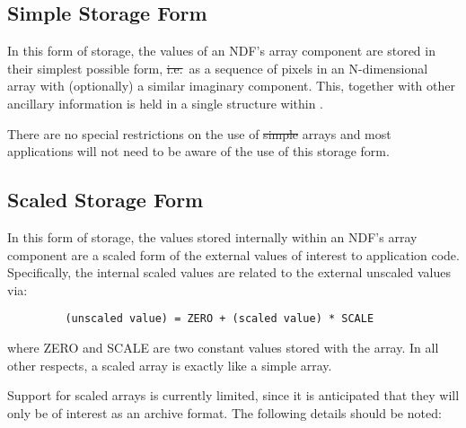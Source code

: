 \subsection{\label{ss:simpleform}Simple Storage Form}

In this form of storage, the values of an NDF's array component 
are stored in their simplest possible form, \st{i.e.}\ as a sequence of
pixels in an N-dimensional array with (optionally) a similar imaginary
component. 
This, together with other ancillary information is held in a single
 structure within .

There are no special restrictions on the use of \st{simple\/} arrays and most
applications will not need to be aware of the use of this storage form. 

\subsection{\label{ss:scaledform}Scaled Storage Form}

In this form of storage, the values stored internally within an NDF's array 
component are a scaled form of the external values of interest to
application code. Specifically, the internal scaled values are related to
the external unscaled values via:

\begin{verbatim}
         (unscaled value) = ZERO + (scaled value) * SCALE
\end{verbatim}

where ZERO and SCALE are two constant values stored with the array. In
all other respects, a scaled array is exactly like a simple array.

Support for scaled arrays is currently limited, since it is anticipated
that they will only be of interest as an archive format. The following
details should be noted:

